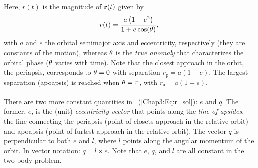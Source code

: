 \documentclass[main.tex]{subfiles}
\begin{document}
\begin{tcolorbox}[sharp corners, colback=blue!30, colframe=blue!80!blue, title=Box \refstepcounter{educhap3}\label{boxchap3:dynIII}\ref{boxchap3:dynIII} -- Orbital Dynamics III]
{Here, $r(t)$ is the magnitude of ${\mathbf{r}}(t)$ given by
\begin{align}
r(t) = \frac{a \left(1-e^2\right)}{1 + e \cos (\theta)},
\end{align}
with $a$ and $e$ the orbital semimajor axis and eccentricity, respectively (they are constants of the motion), whereas $\theta$ is the {\it true anomaly} that characterizes the orbital phase ($\theta$ varies with time). Note that the closest approach in the orbit, the periapsis, corresponds to $\theta=0$ with separation $r_\mathrm{p} = a(1-e)$. The largest separation (apoapsis) is reached when $\theta=\pi$, with $r_\mathrm{a} = a(1+e)$. \\ \\
There are two more constant quantities in \Eq~(\ref{Chap3:Eq:r_sol}): $\unit{e}$ and $\unit{q}$. The former, $\unit{e}$, is the (unit) {\it eccentricity vector} that points along the {\it line of apsides}, the line connecting the periapsis (point of closets approach in the relative orbit) and apoapsis (point of furtest approach in the relative orbit). The vector $\unit{q}$ is perpendicular to both $\unit{e}$ and $\unit{l}$, where $\unit{l}$ points along the angular momentum of the orbit. In vector notation: $\unit{q} = \unit{l} \times \unit{e}$. Note that $\unit{e}$, $\unit{q}$, and $\unit{l}$ are all constant in the two-body problem. }
\end{tcolorbox}
\end{document}
